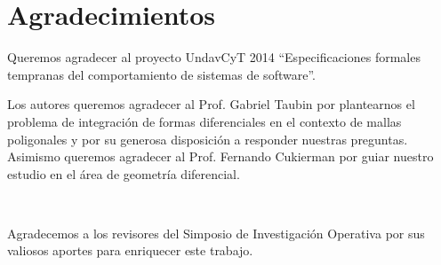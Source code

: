 \documentclass[conference,compsoc,a4paper]{IEEEtran}
\begin{document}



\section*{Agradecimientos}

Queremos agradecer al proyecto UndavCyT 2014 ``Especificaciones formales 
tempranas del comportamiento de sistemas de software''.

\bigskip

Los autores queremos agradecer al Prof. Gabriel Taubin por plantearnos 
el problema de integración de formas diferenciales en el contexto de 
mallas poligonales y por su generosa disposición a responder nuestras 
preguntas. Asimismo queremos agradecer al Prof. Fernando Cukierman por 
guiar nuestro estudio en el área de geometría diferencial.

\

Agradecemos a los revisores del Simposio de Investigación
Operativa por sus valiosos aportes
para enriquecer este trabajo. 



%
%
%
\end{document}
